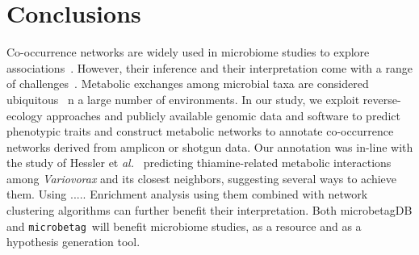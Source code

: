 \documentclass[sn-mathphys,Numbered]{sn-jnl}  %
\theoremstyle{thmstyleone}%
\theoremstyle{thmstyletwo}%
\theoremstyle{thmstylethree}%
\newcommand{\microbetag}{\texttt{microbetag}}
\begin{document}




\section*{Conclusions}
\label{sec:conclusions}


    Co-occurrence networks are widely used in microbiome studies to explore associations~\cite{rottjers2018hairballs}. 
    However, their inference and their interpretation come with a range of challenges~\cite{faust2021open}.
    Metabolic exchanges among microbial taxa are considered ubiquitous~\cite{kost2023metabolic} n a large number of environments. 
    In our study, we exploit reverse-ecology approaches and publicly available genomic data and software to predict phenotypic traits and construct metabolic networks to annotate co-occurrence networks derived from amplicon or shotgun data.
    Our annotation was in-line with the study of Hessler et \textit{al.}~\cite{hessler2023vitamin} predicting thiamine-related metabolic interactions among \textit{Variovorax} and its closest neighbors, suggesting several ways to achieve them. 
    Using ..... 
    Enrichment analysis using them combined with network clustering algorithms can further benefit their interpretation.
    Both microbetagDB and \microbetag~will benefit microbiome studies, as a resource and as a hypothesis generation tool.
\end{document}
